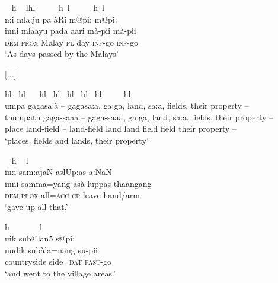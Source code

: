 \ea \label{K051222nar04.31}
\gllll ~ \hspace{0.9cm}h ~ lhl ~~~~~h~l ~~~~~h~l\\
 n:i \s mla:ju pa \~aRi m@pi: m@pi: \\
 inni mlaayu pada aari mà-pii mà-pii  \\
 \textsc{dem.prox} Malay \textsc{pl} day \textsc{inf}-go \textsc{inf}-go \\
`As days passed by the Malays'
\z

[...]

\ea \label{K051222nar04.34a}
\gllll h\hspace{1cm}l ~h\hspace{1.2cm}l ~ ~h\hspace{1.2cm}l  ~h\hspace{0.4cm}l ~h\hspace{0.2cm}l ~h\hspace{0.4cm}l ~h\hspace{0.2cm}l  ~ ~~~h\hspace{0.8cm}l \\
 \dentt umpa\dentd{}  gagasa:\V\~a -- gagasa:\V a, ga:ga, \rm  land, sa:\V a, \rm fields,   \rm their \rm property -- \\
 thumpath  gaga-saa\V a -- gaga-saa\V a, ga:ga, land, sa:\V a, fields,  their property --  \\
 place  land-field -- land-field land land field  field their property\footnotemark{}	 -- \\
`places, fields and lands, their property'
\z 


\ea \label{K051222nar04.34b}
\gllll ~ \hspace{0.5cm}h ~ \hspace{0.8cm}l  \\
 in:i sam:ajaN aslUp:as \dentt a:NaN\\
  inni samma=yang asà-luppas thaangang\footnotemark\\
  \textsc{dem.prox} all=\textsc{acc} \textsc{cp}-leave hand/arm\\
`gave up all that.'
\z
{}

\ea \label{K051222nar04.36}
\gllll \hspace{0.7cm}h ~ ~~~~~l\\
 \V u\postalvd ik sub@lan\~5 s@pi:\\
 uudik subàla=nang su-pii\\
 countryside side=\textsc{dat} \textsc{past}-go\\
`and went to the village areas.'
\z


